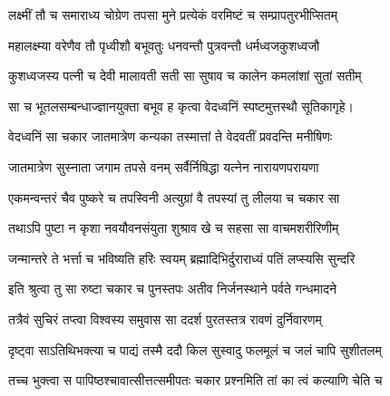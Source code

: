 


\storymeta



\twolineshloka
{लक्ष्मीं तौ च समाराध्य चोग्रेण तपसा मुने}
{प्रत्येकं वरमिष्टं च सम्प्रापतुरभीप्सितम्}%

\twolineshloka
{महालक्ष्म्या वरेणैव तौ पृध्वीशौ बभूवतुः}
{धनवन्तौ पुत्रवन्तौ धर्मध्वजकुशध्वजौ}%

\twolineshloka
{कुशध्वजस्य पत्नी च देवी मालावती सती}
{सा सुषाव च कालेन कमलांशां सुतां सतीम्}%

\twolineshloka
{सा च भूतलसम्बन्धाज्ज्ञानयुक्ता बभूव ह}
{कृत्वा वेदध्वनिं स्पष्टमुत्तस्थौ सूतिकागृहे।}%

\twolineshloka
{वेदध्वनिं सा चकार जातमात्रेण कन्यका}
{तस्मात्तां ते वेदवतीं प्रवदन्ति मनीषिणः}%

\twolineshloka
{जातमात्रेण सुस्नाता जगाम तपसे वनम्}
{सर्वैर्निषिद्धा यत्नेन नारायणपरायणा}%

\twolineshloka
{एकमन्वन्तरं चैव पुष्करे च तपस्विनी}
{अत्युग्रां वै तपस्यां तु लीलया च चकार सा}%

\twolineshloka
{तथाऽपि पुष्टा न कृशा नवयौवनसंयुता}
{शुश्राव खे च सहसा सा वाचमशरीरिणीम्}%

\twolineshloka
{जन्मान्तरे ते भर्त्ता च भविष्यति हरिः स्वयम्}
{ब्रह्मादिभिर्दुराराध्यं पतिं लप्स्यसि सुन्दरि}%

\twolineshloka
{इति श्रुत्वा तु सा रुष्टा चकार च पुनस्तपः}
{अतीव निर्जनस्थाने पर्वते गन्धमादने}%

\twolineshloka
{तत्रैवं सुचिरं तप्त्वा विश्वस्य समुवास सा}
{ददर्श पुरतस्तत्र रावणं दुर्निवारणम्}%

\twolineshloka
{दृष्ट्वा साऽतिथिभक्त्या च पाद्यं तस्मै ददौ किल}
{सुस्वादु फलमूलं च जलं चापि सुशीतलम्}%

\twolineshloka
{तच्च भुक्त्वा स पापिष्ठश्चावात्सीत्तत्समीपतः}
{चकार प्रश्नमिति तां का त्वं कल्याणि चेति च}%


